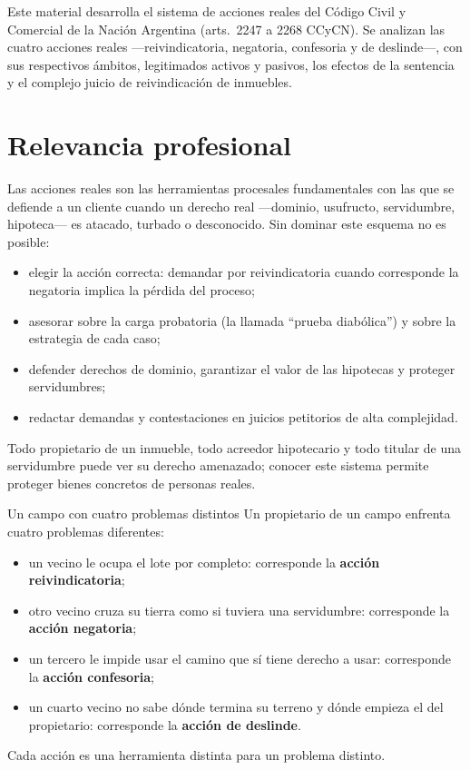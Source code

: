 \documentclass[12pt,oneside]{book}
\begin{document}
Este material desarrolla el sistema de acciones reales del Código Civil y Comercial de la Nación Argentina (arts.\ 2247 a 2268 CCyCN). Se analizan las cuatro acciones reales ---reivindicatoria, negatoria, confesoria y de deslinde---, con sus respectivos ámbitos, legitimados activos y pasivos, los efectos de la sentencia y el complejo juicio de reivindicación de inmuebles.

\section*{Relevancia profesional}

Las acciones reales son las herramientas procesales fundamentales con las que se defiende a un cliente cuando un derecho real ---dominio, usufructo, servidumbre, hipoteca--- es atacado, turbado o desconocido. Sin dominar este esquema no es posible:

\begin{itemize}
    \item elegir la acción correcta: demandar por reivindicatoria cuando corresponde la negatoria implica la pérdida del proceso;
    \item asesorar sobre la carga probatoria (la llamada ``prueba diabólica'') y sobre la estrategia de cada caso;
    \item defender derechos de dominio, garantizar el valor de las hipotecas y proteger servidumbres;
    \item redactar demandas y contestaciones en juicios petitorios de alta complejidad.
\end{itemize}

Todo propietario de un inmueble, todo acreedor hipotecario y todo titular de una servidumbre puede ver su derecho amenazado; conocer este sistema permite proteger bienes concretos de personas reales.

\begin{example}{Un campo con cuatro problemas distintos}
Un propietario de un campo enfrenta cuatro problemas diferentes:
\begin{itemize}
    \item un vecino le ocupa el lote por completo: corresponde la \textbf{acción reivindicatoria};
    \item otro vecino cruza su tierra como si tuviera una servidumbre: corresponde la \textbf{acción negatoria};
    \item un tercero le impide usar el camino que sí tiene derecho a usar: corresponde la \textbf{acción confesoria};
    \item un cuarto vecino no sabe dónde termina su terreno y dónde empieza el del propietario: corresponde la \textbf{acción de deslinde}.
\end{itemize}
Cada acción es una herramienta distinta para un problema distinto.
\end{example}
\end{document}

